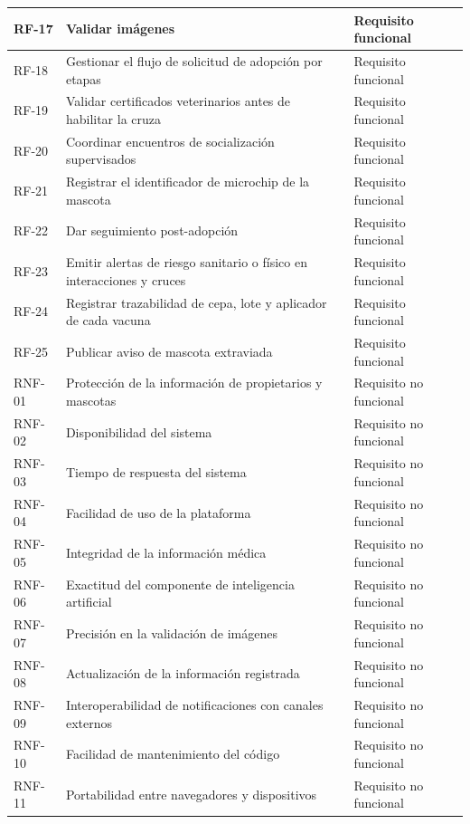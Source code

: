 \documentclass[journal,onecolumn]{IEEEtran}
\begin{document}
\begin{longtable}{@{}p{2.2cm} p{7.5cm} p{3.5cm}@{}}
		\hline
		RF-17 & Validar imágenes & Requisito funcional \\
		\hline
		RF-18 & Gestionar el flujo de solicitud de adopción por etapas & Requisito funcional \\
		\hline
		RF-19 & Validar certificados veterinarios antes de habilitar la cruza & Requisito funcional \\
		\hline
		RF-20 & Coordinar encuentros de socialización supervisados & Requisito funcional \\
		\hline
		RF-21 & Registrar el identificador de microchip de la mascota & Requisito funcional \\
		\hline
		RF-22 & Dar seguimiento post-adopción & Requisito funcional \\
		\hline
		RF-23 & Emitir alertas de riesgo sanitario o físico en interacciones y cruces & Requisito funcional \\
		\hline
		RF-24 & Registrar trazabilidad de cepa, lote y aplicador de cada vacuna & Requisito funcional \\
		\hline
		RF-25 & Publicar aviso de mascota extraviada & Requisito funcional \\
		\hline
		RNF-01 & Protección de la información de propietarios y mascotas & Requisito no funcional \\
		\hline
		RNF-02 & Disponibilidad del sistema & Requisito no funcional \\
		\hline
		RNF-03 & Tiempo de respuesta del sistema & Requisito no funcional \\
		\hline
		RNF-04 & Facilidad de uso de la plataforma & Requisito no funcional \\
		\hline
		RNF-05 & Integridad de la información médica & Requisito no funcional \\
		\hline
		RNF-06 & Exactitud del componente de inteligencia artificial & Requisito no funcional \\
		\hline
		RNF-07 & Precisión en la validación de imágenes & Requisito no funcional \\
		\hline
		RNF-08 & Actualización de la información registrada & Requisito no funcional \\
		\hline
		RNF-09 & Interoperabilidad de notificaciones con canales externos & Requisito no funcional \\
		\hline
		RNF-10 & Facilidad de mantenimiento del código & Requisito no funcional \\
		\hline
		RNF-11 & Portabilidad entre navegadores y dispositivos & Requisito no funcional \\

\end{longtable}
\end{document}
